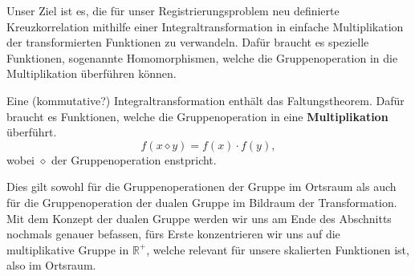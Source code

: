 Unser Ziel ist es, die für unser Registrierungsproblem neu definierte 
Kreuzkorrelation mithilfe einer Integraltransformation in 
einfache Multiplikation der transformierten Funktionen zu verwandeln.
Dafür braucht es spezielle Funktionen, sogenannte Homomorphismen, welche 
die Gruppenoperation in die Multiplikation überführen können. 
\begin{satz}
    \label{buch:papers:mellin:teil2:satz:hom}
    Eine (kommutative?) Integraltransformation enthält das Faltungstheorem.
    Dafür braucht es Funktionen, welche die Gruppenoperation in eine 
    \textbf{Multiplikation} überführt. 
    \[
        f(x \diamond y) = f(x) \cdot f(y),
    \]
    wobei $\diamond$ der Gruppenoperation enstpricht.
\end{satz}
Dies gilt sowohl für die Gruppenoperationen der Gruppe im Ortsraum als auch 
für die Gruppenoperation der dualen Gruppe im Bildraum der Transformation.
Mit dem Konzept der dualen Gruppe werden wir uns am Ende des Abschnitts 
nochmals genauer befassen, fürs Erste konzentrieren wir uns auf die 
multiplikative Gruppe in $\mathbb{R^+}$, welche relevant für unsere 
skalierten Funktionen ist, also im Ortsraum.
\medskip

